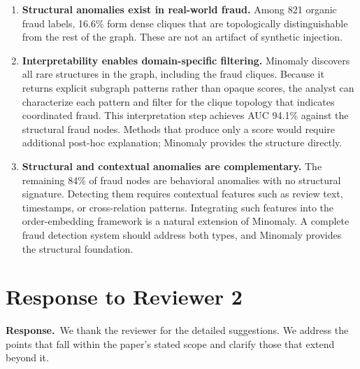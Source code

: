 \documentclass[11pt]{article}
\newcommand{\response}{\par\noindent\textbf{\textcolor{respgreen}{Response.}}\ }
\begin{document}
\begin{enumerate}[leftmargin=1.6em,itemsep=3pt]
  \item \textbf{Structural anomalies exist in real-world fraud.} Among 821 organic fraud labels, 16.6\% form dense cliques that are topologically distinguishable from the rest of the graph. These are not an artifact of synthetic injection.
  \item \textbf{Interpretability enables domain-specific filtering.} Minomaly discovers all rare structures in the graph, including the fraud cliques. Because it returns explicit subgraph patterns rather than opaque scores, the analyst can characterize each pattern and filter for the clique topology that indicates coordinated fraud. This interpretation step achieves AUC 94.1\% against the structural fraud nodes. Methods that produce only a score would require additional post-hoc explanation; Minomaly provides the structure directly.
  \item \textbf{Structural and contextual anomalies are complementary.} The remaining 84\% of fraud nodes are behavioral anomalies with no structural signature. Detecting them requires contextual features such as review text, timestamps, or cross-relation patterns. Integrating such features into the order-embedding framework is a natural extension of Minomaly. A complete fraud detection system should address both types, and Minomaly provides the structural foundation.
\end{enumerate}

\section{Response to Reviewer 2}
\response We thank the reviewer for the detailed suggestions. We address the points that fall within the paper's stated scope and clarify those that extend beyond it.
\end{document}
